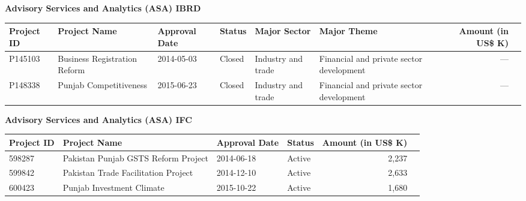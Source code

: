 \documentclass{article}\usepackage[]{graphicx}\usepackage[]{color}
\begin{document}
\begin{minipage}[b]{0.99\textwidth}
\begin{minipage}[b]{0.99\textwidth}
\begin{minipage}[c]{0.99\textwidth}
     \vspace*{0.5cm}
     \end{minipage}
     
     \begin{minipage}[c]{0.99\textwidth} %
     \raggedright{\color{white!30!blue} \textbf{\large Advisory Services and Analytics (ASA) IBRD}}
     \vspace*{0.5cm}
     
{\footnotesize
\begin{tabular}{l>{\raggedright}p{1in}ll>{\raggedright}p{1in}>{\raggedright}p{1in}rl}
 Project ID & Project Name & Approval Date & Status & Major Sector & Major Theme & Amount (in US\$ K) &  \\ 
  \hline
P145103 & Business Registration Reform & 2014-05-03 & Closed & Industry and trade & Financial and private sector development & --- &  \\ 
  P148338 & Punjab Competitiveness & 2015-06-23 & Closed & Industry and trade & Financial and private sector development & --- &  \\ 
  \end{tabular}
}

     \vspace*{0.5cm}
     \end{minipage}
     
     \begin{minipage}[c]{0.99\textwidth} %
     \raggedright{\color{white!30!blue} \textbf{\large Advisory Services and Analytics (ASA) IFC}}
     \vspace*{0.5cm}
     
{\small
\begin{tabular}{l>{\raggedright}p{2.5in}llrl}
 Project ID & Project Name & Approval Date & Status & Amount (in US\$ K) &  \\ 
  \hline
598287 & Pakistan Punjab GSTS Reform Project & 2014-06-18 & Active & 2,237 &  \\ 
  599842 & Pakistan Trade Facilitation Project & 2014-12-10 & Active & 2,633 &  \\ 
  600423 & Punjab Investment Climate & 2015-10-22 & Active & 1,680 &  \\ 
  \end{tabular}
}

     \vspace*{0.5cm}
     \end{minipage}
     
    \end{minipage}
\end{minipage}
 
\end{document}
